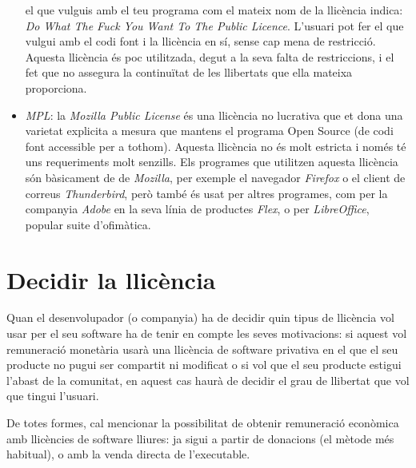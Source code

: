 \begin{itemize}
	el que vulguis amb el teu programa com el mateix nom de la llicència indica:
	\emph{Do What The Fuck You Want To The Public Licence}.
	L'usuari pot fer el que vulgui amb el codi font i la llicència en sí, sense
	cap mena de restricció. Aquesta llicència és poc utilitzada, degut a la seva
	falta de restriccions, i el fet que no assegura la continuïtat de les llibertats
	que ella mateixa proporciona.\cite {tldr}
	\item \emph{MPL}: la \emph{Mozilla Public License} és una llicència no lucrativa 
	que et dona una varietat explicita a mesura que mantens el programa Open Source
	(de codi font accessible per a tothom). Aquesta llicència no és molt estricta
	i només té uns requeriments molt senzills.
	Els programes que utilitzen aquesta llicència són bàsicament de de \emph{Mozilla},
	per exemple el navegador \emph{Firefox} o el client de correus \emph{Thunderbird},
	però també és usat per altres programes, com per la companyia \emph{Adobe} en
	la seva línia de productes \emph{Flex}, o per \emph{LibreOffice}, popular suite
	d'ofimàtica. \cite {tldr}
\end{itemize}

\section{Decidir la llicència}
Quan el desenvolupador (o companyia) ha de decidir quin tipus de llicència vol
usar per el seu software ha de tenir en compte les seves motivacions: si aquest
vol remuneració monetària usarà una llicència de software privativa en el que el 
seu producte no pugui ser compartit ni modificat o si vol que el seu producte estigui l'abast de 
la comunitat, en aquest cas haurà de decidir el grau de llibertat que vol que tingui 
l'usuari.

De totes formes, cal mencionar la possibilitat de obtenir remuneració econòmica amb llicències
de software lliures: ja sigui a partir de donacions (el mètode més habitual), o amb la
venda directa de l'executable.
